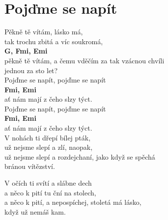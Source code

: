 \section{Pojďme se napít}
\onehalfspacing

Pěkně tě vítám, lásko má,\\
tak trochu zbitá a víc soukromá,\\

\textbf{G, Fmi, Emi}\\

pěkně tě vítám, a čemu vděčím za tak vzácnou chvíli\\
jednou za sto let?\\

Pojďme se napít, pojďme se napít \\
\textbf{Fmi, Emi}\\
ať nám mají z čeho slzy týct.\\
Pojďme se napít, pojďme se napít\\
\textbf{Fmi, Emi}\\
ať nám mají z čeho slzy týct.\\

\sloka
V nohách ti dřepí bílej pták,\\
už nejsme slepí a zlí, naopak,\\
už nejsme slepí a rozdejchaní, jako když se spěchá\\
bránou vítězství.\\


\sloka
V očích ti svítí a slábne dech\\
a něco k pití tu ční na stolech,\\
a něco k pití, a nepospíchej, stoletá má lásko,\\
když už nemáš kam.\\




